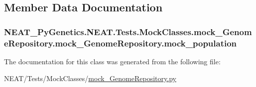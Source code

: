 \subsection{Member Data Documentation}
\subsubsection[{\texorpdfstring{mock\+\_\+population}{mock_population}}]{\setlength{\rightskip}{0pt plus 5cm}N\+E\+A\+T\+\_\+\+Py\+Genetics.\+N\+E\+A\+T.\+Tests.\+Mock\+Classes.\+mock\+\_\+\+Genome\+Repository.\+mock\+\_\+\+Genome\+Repository.\+mock\+\_\+population}\hypertarget{classNEAT__PyGenetics_1_1NEAT_1_1Tests_1_1MockClasses_1_1mock__GenomeRepository_1_1mock__GenomeRepository_abb2dfb4fa59c22b09dede3bcbd27ca4b}{}\label{classNEAT__PyGenetics_1_1NEAT_1_1Tests_1_1MockClasses_1_1mock__GenomeRepository_1_1mock__GenomeRepository_abb2dfb4fa59c22b09dede3bcbd27ca4b}


The documentation for this class was generated from the following file\+:\begin{DoxyCompactItemize}
\item 
N\+E\+A\+T/\+Tests/\+Mock\+Classes/\hyperlink{mock__GenomeRepository_8py}{mock\+\_\+\+Genome\+Repository.\+py}\end{DoxyCompactItemize}
